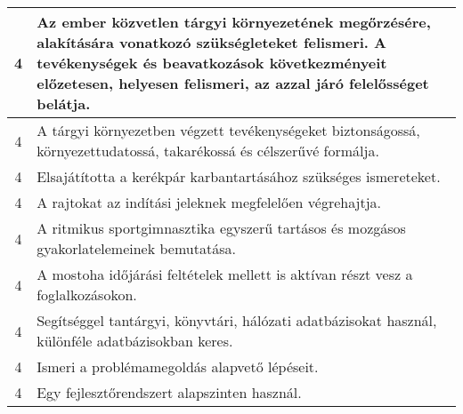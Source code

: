 \begin{longtable}{c | p{12cm} }
                                          4 &  Az ember közvetlen tárgyi környezetének megőrzésére, alakítására vonatkozó szükségleteket felismeri. A tevékenységek és beavatkozások következményeit előzetesen, helyesen felismeri, az azzal járó felelősséget belátja. \\ \hline
                                          4 &  A tárgyi környezetben végzett tevékenységeket biztonságossá, környezettudatossá, takarékossá és célszerűvé formálja. \\ \hline
                                          4 &  Elsajátította a kerékpár karbantartásához szükséges ismereteket. \\ \hline
                                          4 &  A rajtokat az indítási jeleknek megfelelően végrehajtja. \\ \hline
                                          4 &  A ritmikus sportgimnasztika egyszerű tartásos és mozgásos gyakorlatelemeinek bemutatása. \\ \hline
                                          4 &  A mostoha időjárási feltételek mellett is aktívan részt vesz a foglalkozásokon. \\ \hline
                                          4 &  Segítséggel tantárgyi, könyvtári, hálózati adatbázisokat használ, különféle adatbázisokban keres. \\ \hline
                                          4 &  Ismeri a problémamegoldás alapvető lépéseit. \\ \hline
                                          4 &  Egy fejlesztőrendszert alapszinten használ. \\ \hline
                                      
                        \end{longtable}
            \clearpage

